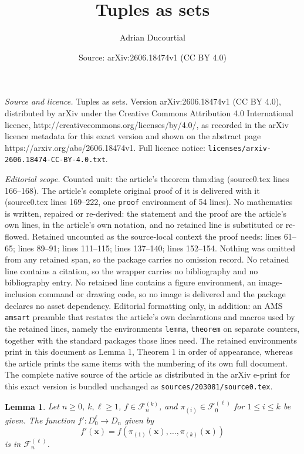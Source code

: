 \documentclass[10pt,a4paper]{amsart}
\title{Tuples as sets}
\author{Adrian Ducourtial}
\date{Source: arXiv:2606.18474v1 (CC BY 4.0)}
\newtheorem{lemma}{Lemma}
\newcommand{\fset}[2]{\mathcal F^{(#1)}_{#2}}
\begin{document}
\maketitle

\noindent\emph{Source and licence.} Tuples as sets. Version arXiv:2606.18474v1 (CC BY 4.0), distributed by arXiv under the Creative Commons Attribution 4.0 International licence, http://creativecommons.org/licenses/by/4.0/, as recorded in the arXiv licence metadata for this exact version and shown on the abstract page https://arxiv.org/abs/2606.18474v1. Full licence notice: \texttt{licenses/arxiv-2606.18474-CC-BY-4.0.txt}.\par\smallskip

\noindent\textit{Editorial scope.} Counted unit: the article's theorem thm:diag (source0.tex lines 166--168). The article's complete original proof of it is delivered with it (source0.tex lines 169--222, one \texttt{proof} environment of 54 lines). No mathematics is written, repaired or re-derived: the statement and the proof are the article's own lines, in the article's own notation, and no retained line is substituted or re-flowed.  Retained uncounted as the source-local context the proof needs: lines 61--65; lines 89--91; lines 111--115; lines 137--140; lines 152--154.  Nothing was omitted from any retained span, so the package carries no omission record.  No retained line contains a citation, so the wrapper carries no bibliography and no bibliography entry.  No retained line contains a figure environment, an image-inclusion command or drawing code, so no image is delivered and the package declares no asset dependency.  Editorial formatting only, in addition: an AMS \texttt{amsart} preamble that restates the article's own declarations and macros used by the retained lines, namely the environments \texttt{lemma}, \texttt{theorem} on separate counters, together with the standard packages those lines need.  The retained environments print in this document as Lemma 1, Theorem 1 in order of appearance, whereas the article prints the same items with the numbering of its own full document.  The complete native source of the article as distributed in the arXiv e-print for this exact version is bundled unchanged as \texttt{sources/203081/source0.tex}.
\begin{lemma}\label{lem:var}
    Let $n \geq 0$, $k, \ell \geq 1$, $f \in \fset kn$, and $\pi_{(i)} \in \fset \ell0$ for $1 \leq i \leq k$ be given. The function $f' : D_0^\ell \to D_n$ given by
    \[f'(\mathbf x) = f(\pi_{(1)}(\mathbf x), \dots, \pi_{(k)}(\mathbf x))\]
    is in $\fset \ell n$.
\end{lemma}
\end{document}
